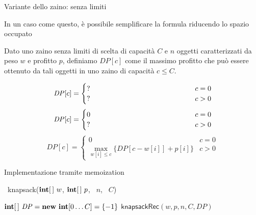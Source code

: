 \begin{frame}{Variante dello zaino: senza limiti}

\vspace{-9pt}
\begin{myboxtitle}
In un caso come questo, è possibile semplificare la formula riducendo
lo spazio occupato
\end{myboxtitle}

\begin{myboxtitle}
Dato uno zaino senza limiti di scelta di capacità $C$ e $n$ oggetti caratterizzati
da peso $w$ e profitto $p$, definiamo $\mathit{DP}[c]$ come il
massimo profitto che può essere ottenuto da tali oggetti
in uno zaino di capacità $c \leq  C$.
\end{myboxtitle}

\begin{overprint}
\[
\mathit{DP}[c] = \begin{cases}
  \makebox[5cm][l]{?} & c=0 \\
  \makebox[5cm][l]{?} & c>0
\end{cases}
\]
\[
\mathit{DP}[c] = \begin{cases}
  0 & c=0 \\
  \makebox[5cm][l]{?} & c>0
\end{cases}
\]
\[
\mathit{DP}[c] = \begin{cases}
  0 & c=0 \\
  \max_{w[i] \leq c} \{ \mathit{DP}[c-w[i]]+p[i] \} & c>0
\end{cases}
\]
\end{overprint}

\end{frame}

\begin{frame}{Implementazione tramite memoization}

\vspace{-9pt}
\begin{Procedure}
\caption[A]{\INTEGER\ \textsf{knapsack}($\INTEGER[\,]\ w$, $\INTEGER[\,]\ p$, \INTEGER\ $n$, \INTEGER\ $C$)}
  $\INTEGER[\,]\ \mathit{DP} = \NEW\ \INTEGER[0 \ldots C] = \{ -1 \}$\;
  \Return $\textsf{knapsackRec}(w, p, n, C, \mathit{DP})$\;
\end{Procedure}
\end{frame}
  
